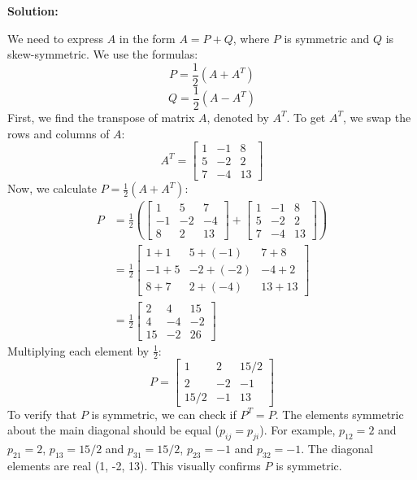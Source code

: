 \documentclass{article}
\begin{document}
\textbf{Solution:}

We need to express $A$ in the form $A = P + Q$, where $P$ is symmetric and $Q$ is skew-symmetric. We use the formulas:
\[ P = \frac{1}{2}(A + A^T) \]
\[ Q = \frac{1}{2}(A - A^T) \]
First, we find the transpose of matrix $A$, denoted by $A^T$. To get $A^T$, we swap the rows and columns of $A$:
\[ A^T = \begin{bmatrix} 1 & -1 & 8 \\ 5 & -2 & 2 \\ 7 & -4 & 13 \end{bmatrix} \]
Now, we calculate $P = \frac{1}{2}(A + A^T)$:
\begin{align*} P &= \frac{1}{2} \left( \begin{bmatrix} 1 & 5 & 7 \\ -1 & -2 & -4 \\ 8 & 2 & 13 \end{bmatrix} + \begin{bmatrix} 1 & -1 & 8 \\ 5 & -2 & 2 \\ 7 & -4 & 13 \end{bmatrix} \right) \\ &= \frac{1}{2} \begin{bmatrix} 1+1 & 5+(-1) & 7+8 \\ -1+5 & -2+(-2) & -4+2 \\ 8+7 & 2+(-4) & 13+13 \end{bmatrix} \\ &= \frac{1}{2} \begin{bmatrix} 2 & 4 & 15 \\ 4 & -4 & -2 \\ 15 & -2 & 26 \end{bmatrix} \end{align*}
Multiplying each element by $\frac{1}{2}$:
\[ P = \begin{bmatrix} 1 & 2 & 15/2 \\ 2 & -2 & -1 \\ 15/2 & -1 & 13 \end{bmatrix} \]
To verify that $P$ is symmetric, we can check if $P^T = P$. The elements symmetric about the main diagonal should be equal ($p_{ij} = p_{ji}$). For example, $p_{12}=2$ and $p_{21}=2$, $p_{13}=15/2$ and $p_{31}=15/2$, $p_{23}=-1$ and $p_{32}=-1$. The diagonal elements are real (1, -2, 13). This visually confirms $P$ is symmetric.
\end{document}
